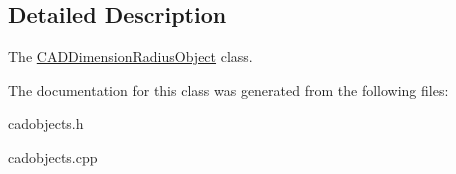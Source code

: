 \subsection{Detailed Description}
The \hyperlink{class_c_a_d_dimension_radius_object}{C\+A\+D\+Dimension\+Radius\+Object} class. 

The documentation for this class was generated from the following files\+:\begin{DoxyCompactItemize}
\item 
cadobjects.\+h\item 
cadobjects.\+cpp\end{DoxyCompactItemize}
